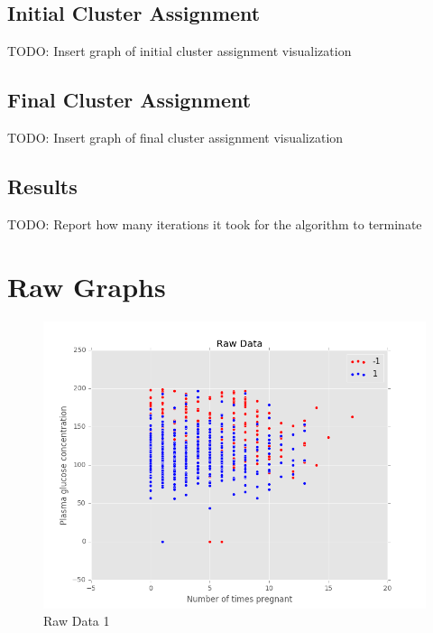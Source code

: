 \documentclass[12pt]{article}
\begin{document}
\subsection*{Initial Cluster Assignment}
TODO: Insert graph of initial cluster assignment visualization
\subsection*{Final Cluster Assignment}
TODO: Insert graph of final cluster assignment visualization
\subsection*{Results}
TODO: Report how many iterations it took for the algorithm to terminate

\newpage
\section*{Raw Graphs}
\begin{figure}[H]
\begin{center}
\includegraphics[scale=0.66]{graph1.png}
\caption{Raw Data 1}
\label{Raw Data 1}
\end{center}
\end{figure}
\end{document}
